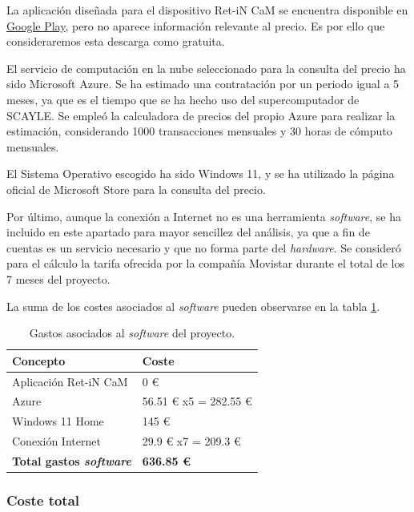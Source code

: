 La aplicación diseñada para el dispositivo Ret-iN CaM se encuentra disponible en \href{https://play.google.com/store/apps/details?id=es.canelatech.retincam&hl=es&gl=US}{Google Play}, pero no aparece información relevante al precio. Es por ello que consideraremos esta descarga como gratuita.

El servicio de computación en la nube seleccionado para la consulta del precio ha sido Microsoft Azure. Se ha estimado una contratación por un periodo igual a 5 meses, ya que es el tiempo que se ha hecho uso del supercomputador de SCAYLE. Se empleó la calculadora de precios del propio Azure para realizar la estimación, considerando 1000 transacciones mensuales y 30 horas de cómputo mensuales.

El Sistema Operativo escogido ha sido Windows 11, y se ha utilizado la página oficial de Microsoft Store para la consulta del precio.

Por último, aunque la conexión a Internet no es una herramienta \textit{software}, se ha incluido en este apartado para mayor sencillez del análisis, ya que a fin de cuentas es un servicio necesario y que no forma parte del \textit{hardware}. Se consideró para el cálculo la tarifa ofrecida por la compañía Movistar durante el total de los 7 meses del proyecto.

La suma de los costes asociados al \textit{software} pueden observarse en la tabla \ref{tab:cost_soft}.

\begin{table}[]
\centering
\begin{tabular}{@{}ll@{}}
\toprule
\rowcolor[HTML]{C0C0C0} 
Concepto                       & Coste                 \\ \midrule
Aplicación Ret-iN CaM          & 0 €                   \\
Azure                          & 56.51 € x5 = 282.55 € \\
Windows 11 Home                & 145 €                 \\
Conexión Internet              & 29.9 € x7 = 209.3 €   \\ \midrule
\textbf{Total gastos \textit{software}} & \textbf{636.85 €}              \\ \bottomrule
\end{tabular}
\caption{Gastos asociados al \textit{software} del proyecto.}
\label{tab:cost_soft}
\end{table}

\subsubsection{Coste total}

